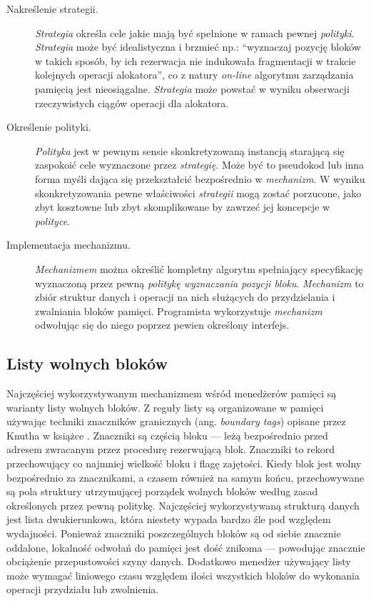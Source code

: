 \documentclass[12pt,a4paper,titlepage,twoside]{mwart}
\begin{document}
\begin{description}

\item[Nakreślenie strategii.] \textit{Strategia} określa cele jakie mają być
spełnione w ramach pewnej \textit{polityki}. \textit{Strategia} może być
idealistyczna i brzmieć np.: ``wyznaczaj pozycję bloków w takich sposób, by ich
rezerwacja nie indukowała fragmentacji w trakcie kolejnych operacji
alokatora'', co z natury \textit{on-line} algorytmu zarządzania pamięcią jest
nieosiągalne.  \textit{Strategia} może powstać w wyniku obserwacji
rzeczywistych ciągów operacji dla alokatora.

\item[Określenie polityki.] \textit{Polityka} jest w pewnym sensie
skonkretyzowaną instancją starającą się zaspokoić cele wyznaczone przez
\textit{strategię}. Może być to pseudokod lub inna forma myśli dająca się
przekształcić bezpośrednio w \textit{mechanizm}. W wyniku skonkretyzowania
pewne właściwości \textit{strategii} mogą zostać porzucone, jako zbyt kosztowne
lub zbyt skomplikowane by zawrzeć jej koncepcje w \textit{polityce}.

\item[Implementacja mechanizmu.] \textit{Mechanizmem} można określić kompletny
algorytm spełniający specyfikację wyznaczoną przez pewną \textit{politykę
wyznaczania pozycji bloku}. \textit{Mechanizm} to zbiór struktur danych i
operacji na nich służących do przydzielania i zwalniania bloków pamięci.
Programista wykorzystuje \textit{mechanizm} odwołując się do niego poprzez
pewien określony interfejs.

\end{description}

\subsection{Listy wolnych bloków}

Najczęściej wykorzystywanym mechanizmem wśród menedżerów pamięci są warianty
listy wolnych bloków. Z reguły listy są organizowane w pamięci używając
techniki znaczników granicznych (ang.  \textit{boundary tags}) opisane przez
Knutha w książce \cite{knuth73fundamental}. Znaczniki są częścią bloku --- leżą
bezpośrednio przed adresem zwracanym przez procedurę rezerwującą blok.
Znaczniki to rekord przechowujący co najmniej wielkość bloku i flagę zajętości.
Kiedy blok jest wolny bezpośrednio za znacznikami, a czasem również na samym
końcu, przechowywane są pola struktury utrzymującej porządek wolnych bloków
według zasad określonych przez pewną politykę. Najczęściej wykorzystywaną
strukturą danych jest lista dwukierunkowa, która niestety wypada bardzo źle pod
względem wydajności. Ponieważ znaczniki poszczególnych bloków są od siebie
znacznie oddalone, lokalność odwołań do pamięci jest dość znikoma --- powodując
znacznie obciążenie przepustowości szyny danych. Dodatkowo menedżer używający
listy może wymagać liniowego czasu względem ilości wszystkich bloków do
wykonania operacji przydziału lub zwolnienia.
\end{document}
